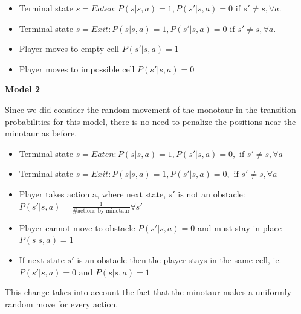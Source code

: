 \documentclass{article}
\begin{document}
\begin{itemize}
  \item Terminal state $ s = Eaten: P(s|s,a) = 1, P(s'|s,a) = 0 \textrm{ if } s' \neq s,  \forall a$.
  
  \item Terminal state $s = Exit:  P(s|s,a) = 1, P(s'|s,a) = 0 \textrm{ if } s' \neq s,  \forall a$.
  \item Player moves to empty cell $P(s'|s,a) = 1$
  \item Player moves to impossible cell $P(s'|s,a) = 0$
\end{itemize}
\par 
\textbf{Model 2}
\par
Since we did consider the random movement of the monotaur in the transition probabilities for this model, there is no need to penalize the positions near the minotaur as before. 
\begin{itemize}
  \item Terminal state $s=Eaten: P(s|s,a) = 1, P(s'|s,a) = 0, \textrm{ if } s' \neq s, \forall a $
  \item Terminal state $s=Exit: P(s|s,a) = 1, P(s'|s,a) = 0, \textrm{ if } s' \neq s, \forall a $
  \item Player takes action a, where next state, $s'$ is not an obstacle: \\
  $P(s'|s,a) = \frac{1}{\textrm{\#actions by minotaur}}  \forall s'$
  \item Player cannot move to obstacle $P(s'|s,a) = 0$ and must stay in place  $P(s|s,a) = 1$
  \item If next state $s'$ is an obstacle then the player stays in the same cell, ie. $P(s'|s,a)=0$ and $P(s|s,a)=1$
\end{itemize}

This change takes into account the fact that the minotaur makes a uniformly random move for every action.
\end{document}
